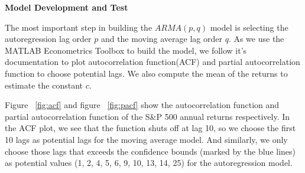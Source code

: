 \documentclass{article}
\begin{document}
\vspace{\baselineskip}
\textbf{Model Development and Test}

The most important step in building the $ARMA(p, q)$ model is selecting the autoregression lag order $p$ and the moving average lag order $q$. As we use the MATLAB Econometrics Toolbox to build the model, we follow it's documentation\cite{lags} to plot autocorrelation function(ACF) and partial autocorrelation function to choose potential lags. We also compute the mean of the returns to estimate the constant $c$.

Figure ~\ref{fig:acf} and figure ~\ref{fig:pacf} show the autocorrelation function and partial autocorrelation function of the S\&P 500 annual returns respectively. In the ACF plot, we see that the function shuts off at lag 10, so we choose the first 10 lags as potential lags for the moving average model. And similarly, we only choose those lags that exceeds the confidence bounds (marked by the blue lines) as potential values (1, 2, 4, 5, 6, 9, 10, 13, 14, 25) for the autoregression model.
\end{document}
